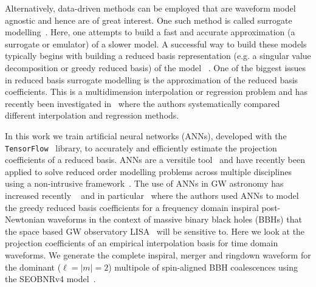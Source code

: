 \documentclass[aps,prd,reprint,superscriptaddress,preprintnumbers,showpacs,nofootinbib]{revtex4-1}
\begin{document}
Alternatively, data-driven methods can be employed that are waveform model
agnostic and hence are of great interest.
One such method is called surrogate modelling~\cite{PhysRevX.4.031006}. Here,
one attempts to build a fast and accurate approximation (a surrogate or
emulator) of a slower model. A successful way to build these models typically
begins with building a reduced basis representation (e.g. a singular value
decomposition or greedy reduced basis) of the model
~\cite{PhysRevX.4.031006,Smith2013TowardsRP,
2014CQGra..31s5010P,Cannon2012InterpolatingCB,
Barta2018FastPA,Setyawati2019EnhancingGW,Cannon2013InterpolationIW}. One of the
biggest issues in reduced basis surrogate modelling is the approximation of the
reduced basis coefficients. This is a multidimension interpolation or regression
problem and has recently been investigated in~\cite{Setyawati:2019xzw} where the
authors systematically compared different interpolation and regression methods.

In this work we train artificial neural networks (ANNs), developed with the {\tt
TensorFlow}~\cite{tensorflow2015-whitepaper} library, to accurately and
efficiently estimate the projection coefficients of a reduced basis. ANNs are a
versitile tool~\cite{doi:10.1063/1.1144830} and have recently been applied to
solve reduced order modelling problems across multiple disciplines using a
non-intrusive
framework~\cite{Hesthavena2017NonintrusiveRO,Jacquier2021NonIntrusiveRM,2020PhyD..41232614G,MuckeNikolajTakata2019ROMf,SAN2019271}.
The use of ANNs in GW astronomy has increased recently
~\cite{Setyawati:2019xzw,Wong2020GravitationalWP,Wong2020GravitationalwaveSI,Gerosa2020GravitationalwaveSE,Marulanda2020DeepLG,2020arXiv200601509S,PhysRevD.100.044009,PhysRevD.101.064009,Gabbard2019BayesianPE,Haegel2020PredictingTP,Green2020GravitationalwavePE,Cuoco2020EnhancingGS,Lin2019BinaryNS,Shen2019DeepLA,Shen2019DenoisingGW,Carrillo2015TimeSA,2020arXiv200704176L,Graff2013SKYNETAE,2020arXiv200806071C}
and in particular~\cite{PhysRevLett.122.211101} where the authors used ANNs to
model the greedy reduced basis coefficients for a frequency domain inspiral
post-Newtonian waveforms in the context of massive binary black holes (BBHs)
that the space based GW observatory LISA~\cite{AmaroSeoane2017LaserIS} will be
sensitive to. Here we look at the projection coefficients of an empirical
interpolation basis for time domain waveforms. We generate the complete
inspiral, merger and ringdown waveform for the dominant ($\ell = |m| = 2$)
multipole of spin-aligned BBH coalescences using the SEOBNRv4
model~\cite{2017PhRvD..95d4028B}.
\end{document}
